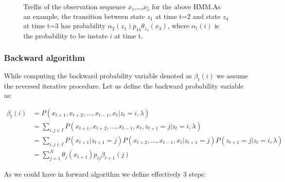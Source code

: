 \begin{figure}[htbp]
\begin{center}
\end{center}
\caption{Trellis of the observation sequence $x_1$,\ldots,$x_5$ for the above HMM.\@ As an example, the transition between state $z_1$ at time t=2 and state $z_4$ at time t=3 has probability $\alpha_2(z_1)p_{14}\theta_{z_4}(x_3)$, where $\alpha_t(i)$ is the probability to be instate $i$ at time t.}
\end{figure}

\pagebreak

\subsubsection{Backward algorithm}

While computing the backward probability variable denoted as $\beta_t(i)$ we assume the reversed iterative procedure. Let us define the backward probability variable as:

\begin{align}
\beta_t(i) &= P(x_{t+1},x_{t+2},\ldots,x_{t-1},x_t|z_t=i ,\lambda) \\ \nonumber
&= \sum_{i,j \in I} P(x_{t+1},x_{t+2},\ldots,x_{t-1},x_t,z_{t+1}=j|z_t=i ,\lambda)   \\ \nonumber
&= \sum_{i,j \in I} P(x_{t+1}|z_{t+1}=j) P(x_{t+2},\ldots,x_{t-1},x_t|z_{t+1}=j) P(z_{t+1}=j|z_{t}=i,\lambda) \\ \nonumber
&= \sum_{j=1}^N \theta_j(x_{t+1})p_{ij} \beta_{t+1}(j)
\end{align}

As we could have in forward algorithm we define effectively 3 steps:

